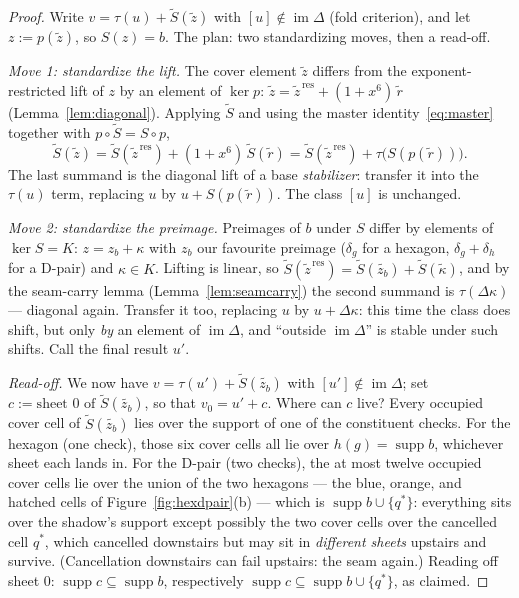 \documentclass[11pt]{article}
\theoremstyle{plain}
\theoremstyle{definition}
\theoremstyle{remark}
\newcommand{\suppop}{\operatorname{supp}}
\newcommand{\imD}{\operatorname{im}\Delta}
\begin{document}
\begin{proof}
Write $v = \tau(u) + \widetilde S(\widetilde z)$ with $[u] \notin \imD$
(fold criterion), and let $z := p(\widetilde z)$, so $S(z) = b$. The plan:
two standardizing moves, then a read-off.

\emph{Move 1: standardize the lift.} The cover element $\widetilde z$
differs from the exponent-restricted lift of $z$ by an element of
$\ker p$: $\widetilde z = \widetilde{z}^{\,\mathrm{res}} +
(1+x^6)\,\widetilde r$ (Lemma~\ref{lem:diagonal}). Applying $\widetilde S$
and using the master identity~\eqref{eq:master} together with
$p \circ \widetilde S = S \circ p$,
\[
\widetilde S(\widetilde z) = \widetilde S(\widetilde z^{\,\mathrm{res}})
+ (1+x^6)\,\widetilde S(\widetilde r)
= \widetilde S(\widetilde z^{\,\mathrm{res}}) +
\tau\bigl(S(p(\widetilde r))\bigr).
\]
The last summand is the diagonal lift of a base \emph{stabilizer}:
transfer it into the $\tau(u)$ term, replacing $u$ by
$u + S(p(\widetilde r))$. The class $[u]$ is unchanged.

\emph{Move 2: standardize the preimage.} Preimages of $b$ under $S$ differ
by elements of $\ker S = K$: $z = z_b + \kappa$ with $z_b$ our favourite
preimage ($\delta_g$ for a hexagon, $\delta_g + \delta_h$ for a D-pair)
and $\kappa \in K$. Lifting is linear, so
$\widetilde S(\widetilde z^{\,\mathrm{res}}) =
\widetilde S(\widetilde{z_b}) + \widetilde S(\widetilde\kappa)$, and by
the seam-carry lemma (Lemma~\ref{lem:seamcarry}) the second summand is
$\tau(\Delta\kappa)$ --- diagonal again. Transfer it too, replacing $u$ by
$u + \Delta\kappa$: this time the class does shift, but only \emph{by} an
element of $\imD$, and ``outside $\imD$'' is stable under such shifts.
Call the final result $u'$.

\emph{Read-off.} We now have $v = \tau(u') + \widetilde S(\widetilde{z_b})$
with $[u'] \notin \imD$; set $c := \text{sheet 0 of }\widetilde
S(\widetilde{z_b})$, so that $v_0 = u' + c$. Where can $c$ live? Every
occupied cover cell of $\widetilde S(\widetilde{z_b})$ lies over the
support of one of the constituent checks. For the hexagon (one check),
those six cover cells all lie over $h(g) = \suppop b$, whichever sheet
each lands in. For the D-pair (two checks), the at most twelve occupied
cover cells lie over the union of the two hexagons --- the blue, orange,
and hatched cells of Figure~\ref{fig:hexdpair}(b) --- which is
$\suppop b \cup \{q^*\}$: everything sits over the shadow's support except
possibly the two cover cells over the cancelled cell $q^*$, which
cancelled downstairs but may sit in \emph{different sheets} upstairs and
survive. (Cancellation downstairs can fail upstairs: the seam again.)
Reading off sheet $0$: $\suppop c \subseteq \suppop b$, respectively
$\suppop c \subseteq \suppop b \cup \{q^*\}$, as claimed.
\end{proof}
\end{document}
